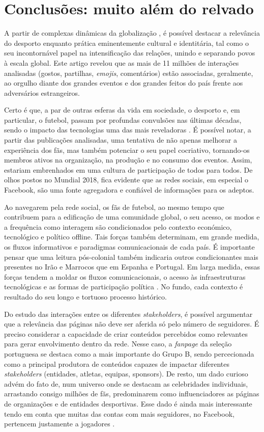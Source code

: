 \documentclass{textolivre}
\begin{document}
\section{Conclusões: muito além do relvado}\label{sec-conclusoes}
A partir de complexas dinâmicas da globalização \cite{giddens1999}, é possível destacar a relevância do desporto enquanto prática eminentemente cultural e identitária, tal como o seu incontornável papel na intensificação das relações, unindo e separando povos à escala global. Este artigo revelou que as mais de 11 milhões de interações analisadas (gostos, partilhas, \emph{emojis}, comentários) estão associadas, geralmente, ao orgulho diante dos grandes eventos e dos grandes feitos do país frente aos adversários estrangeiros.

Certo é que, a par de outras esferas da vida em sociedade, o desporto e, em particular, o futebol, passam por profundas convulsões nas últimas décadas, sendo o impacto das tecnologias uma das mais reveladoras \cite{castells2007, castells2009}. É possível notar, a partir das publicações analisadas, uma tentativa de não apenas melhorar a experiência dos fãs, mas também potenciar o seu papel cocriativo, tornando-os membros ativos na organização, na produção e no consumo dos eventos. Assim, estariam embrenhados em uma cultura de participação de todos para todos. De olhos postos no Mundial 2018, fica evidente que as redes sociais, em especial o Facebook, são uma fonte agregadora e confiável de informações para os adeptos.

Ao navegarem pela rede social, os fãs de futebol, ao mesmo tempo que contribuem para a edificação de uma comunidade global, o seu acesso, os modos e a frequência como interagem são condicionados pelo contexto económico, tecnológico e político offline. Tais forças também determinam, em grande medida, os fluxos informativos e paradigmas comunicacionais de cada país. É importante pensar que uma leitura pós-colonial também indicaria outros condicionantes mais presentes no Irão e Marrocos que em Espanha e Portugal. Em larga medida, essas forças tendem a moldar os fluxos comunicacionais, o acesso às infraestruturas tecnológicas e as formas de participação política \cite{hobsbawm2003, kamrava2012}. No fundo, cada contexto é resultado do seu longo e tortuoso processo histórico.

Do estudo das interações entre os diferentes \emph{stakeholders}, é possível argumentar que a relevância das páginas não deve ser aferida só pelo número de seguidores. É preciso considerar a capacidade de criar conteúdos percebidos como relevantes para gerar envolvimento dentro da rede. Nesse caso, a \emph{fanpage} da seleção portuguesa se destaca como a mais importante do Grupo B, sendo percecionada como a principal produtora de conteúdos capazes de impactar diferentes \emph{stakeholders} (entidades, atletas, equipas, sponsors). De resto, um dado curioso advém do fato de, num universo onde se destacam as celebridades individuais, arrastando consigo milhões de fãs, predominarem como influenciadores as páginas de organizações e de entidades desportivas. Esse dado é ainda mais interessante tendo em conta que muitas das contas com mais seguidores, no Facebook, pertencem justamente a jogadores \cite{clavio2010}.
\end{document}
